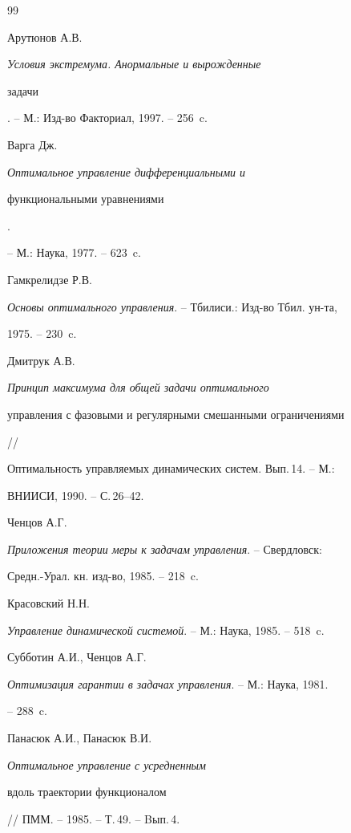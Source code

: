 \begin{thebibliography}{99}







Арутюнов А.В.


{\em Условия экстремума. Анормальные и вырожденные


задачи}. -- М.: Изд-во Факториал, 1997. -- 256~c.




Варга Дж. {\em Оптимальное управление дифференциальными и 


функциональными уравнениями}.


-- М.: Наука, 1977. -- 623~c.




Гамкрелидзе Р.В.


{\em Основы оптимального управления}. -- Тбилиси.: Изд-во Тбил. ун-та, 


1975. -- 230~c.




Дмитрук А.В.


{\em Принцип максимума для общей задачи оптимального


управления с фазовыми и регулярными смешанными ограничениями} //


Оптимальность управляемых динамических систем. Вып.\,14. -- М.:


ВНИИСИ, 1990. -- С.\,26--42.




Ченцов А.Г.


{\em Приложения теории меры к задачам управления}. -- Свердловск:


Средн.-Урал. кн. изд-во, 1985. -- 218~c.




Красовский Н.Н.


{\em Управление динамической системой}. -- М.: Наука, 1985. -- 518~c.




Субботин А.И., Ченцов А.Г.


{\em Оптимизация гарантии в задачах управления}. -- М.: Наука, 1981. 


-- 288~c.




Панасюк А.И., Панасюк В.И. {\em Оптимальное управление с усредненным


вдоль траектории функционалом} // ПММ. -- 1985. -- Т.\,49. -- Bып.\,4.



\end{thebibliography}
